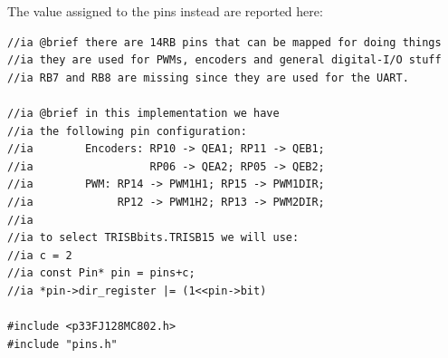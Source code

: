 \documentclass[10pt,a4paper, notitlepage]{report}
\begin{document}
The value assigned to the pins instead are reported here:
\begin{lstlisting}[style=CStyle]
//ia @brief there are 14RB pins that can be mapped for doing things
//ia they are used for PWMs, encoders and general digital-I/O stuff
//ia RB7 and RB8 are missing since they are used for the UART.

//ia @brief in this implementation we have 
//ia the following pin configuration:
//ia        Encoders: RP10 -> QEA1; RP11 -> QEB1; 
//ia                  RP06 -> QEA2; RP05 -> QEB2; 
//ia        PWM: RP14 -> PWM1H1; RP15 -> PWM1DIR; 
//ia             RP12 -> PWM1H2; RP13 -> PWM2DIR; 
//ia
//ia to select TRISBbits.TRISB15 we will use:
//ia c = 2
//ia const Pin* pin = pins+c;
//ia *pin->dir_register |= (1<<pin->bit)

#include <p33FJ128MC802.h>
#include "pins.h"


\end{lstlisting}
\end{document}
